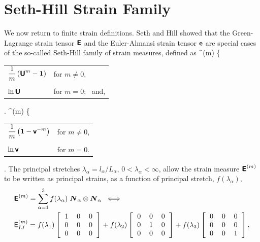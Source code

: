 \section{Seth-Hill Strain Family}
\label{section:seth_hill}
We now return to finite strain definitions. Seth and Hill showed that the Green-Lagrange strain tensor $\mbox{\sffamily\bfseries E}$ and the Euler-Almansi strain tensor $\mbox{\sffamily\bfseries e}$ are special cases of the so-called Seth-Hill family of strain measures, defined as
\be
 \tEbold^{(m)}  
 \left\{ 
 \begin{tabular}{ll}
   $\dst\frac{1}{m}\left(\tUbold^m - \vid \right)$ & for $m\neq0$, \\
   & \\
     $\ln\tUbold$ & for $m=0$; \mbox{ and},
 \end{tabular}
 \right.
 \label{eq:seth_hill}
\ee
\be
 \tebold^{(m)}  
 \left\{ 
 \begin{tabular}{ll}
     $\dst\frac{1}{m}\left(\vid - \tvbold^{-m} \right)$ & for $m\neq0$, \\
   & \\
     $\ln\tvbold$ & for $m=0$.
 \end{tabular}
 \right.
 \label{eq:seth_hill_spatial}
\ee
The principal stretches $\lambda_{\alpha} = l_{\alpha} / L_{\alpha}$, $0 < \lambda_{\alpha} < \infty$, allow the strain measure $\mbox{\sffamily\bfseries E}^{(m)}$ to be written as principal strains, as a function of principal stretch, $f(\lambda_{\alpha})$,
\begin{align}
    & \tEbold^{(m)} 
    = \sum_{\alpha=1}^3 f(\lambda_{\alpha}) \; \vN_{\alpha} \otimes \vN_{\alpha}
  \;\;\Longleftrightarrow \;\; 
  \nonumber \\
  & 
    \tE^{(m)}_{IJ} = f(\lambda_1)
  \left[ 
  \begin{tabular}{ccc}
  1 & 0 & 0 \\ 
  0 & 0 & 0 \\
  0 & 0 & 0 
  \end{tabular}
  \right] 
  + 
  f(\lambda_2)
  \left[ 
  \begin{tabular}{ccc}
  0 & 0 & 0 \\ 
  0 & 1 & 0 \\
  0 & 0 & 0 
  \end{tabular}
  \right] 
  + 
  f(\lambda_3)
  \left[ 
  \begin{tabular}{ccc}
  0 & 0 & 0 \\ 
  0 & 0 & 0 \\
  0 & 0 & 1 
  \end{tabular}
  \right],
\end{align}
